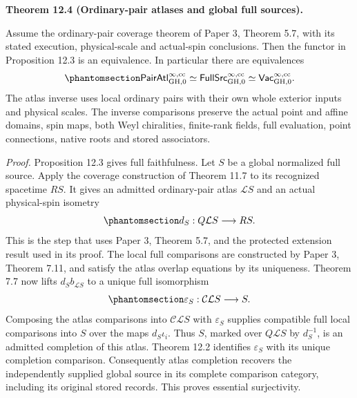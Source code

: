 \documentclass[
  english,
  11pt,
  reqno]{amsart}
\makeatletter
\newcommand{\pandocstatementheading}[1]{%
  \par\addpenalty{\@beginparpenalty}%
  \addvspace{.5\baselineskip plus .2\baselineskip minus .2\baselineskip}%
  {\normalfont\bfseries #1\par}%
  \nobreak\@afterindenttrue\@afterheading
}
\makeatother
\begin{document}
\pandocstatementheading{\protect{}\label{thm:ordinary-atlas-full-source-equivalence}Theorem 12.4 (Ordinary-pair atlases and global full sources).}

Assume the ordinary-pair coverage theorem of Paper 3, Theorem 5.7, with
its stated execution, physical-scale and actual-spin conclusions. Then
the functor in Proposition 12.3 is an equivalence. In particular there
are equivalences
\begin{equation}\protect\phantomsection\label{eq:ordinary-atlas-global-correspondence}{
\mathsf{PairAtl}^{\infty,\mathrm{cc}}_{\mathrm{GH},0}
\simeq
\mathsf{FullSrc}^{\infty,\mathrm{cc}}_{\mathrm{GH},0}
\simeq
\mathsf{Vac}^{\infty,\mathrm{cc}}_{\mathrm{GH},0}.
}\end{equation} The atlas inverse uses local ordinary pairs with their
own whole exterior inputs and physical scales. The inverse comparisons
preserve the actual point and affine domains, spin maps, both Weyl
chiralities, finite-rank fields, full evaluation, point connections,
native roots and stored associators.

\emph{Proof.} Proposition 12.3 gives full faithfulness. Let \(S\) be a
global normalized full source. Apply the coverage construction of
Theorem 11.7 to its recognized spacetime \(RS\). It gives an admitted
ordinary-pair atlas \(\mathcal L S\) and an actual physical-spin
isometry
\begin{equation}\protect\phantomsection\label{eq:ordinary-atlas-inverse-geometry}{
d_S:Q\mathcal L S\longrightarrow RS.
}\end{equation} This is the step that uses Paper 3, Theorem 5.7, and the
protected extension result used in its proof. The local full comparisons
are constructed by Paper 3, Theorem 7.11, and satisfy the atlas overlap
equations by its uniqueness. Theorem 7.7 now lifts
\(d_S b_{\mathcal L S}\) to a unique full isomorphism
\begin{equation}\protect\phantomsection\label{eq:ordinary-atlas-inverse-counit}{
\varepsilon_S:\mathcal C\mathcal L S\longrightarrow S.
}\end{equation} Composing the atlas comparisons into
\(\mathcal C\mathcal L S\) with \(\varepsilon_S\) supplies compatible
full local comparisons into \(S\) over the maps \(d_S\iota_i\). Thus
\(S\), marked over \(Q\mathcal L S\) by \(d_S^{-1}\), is an admitted
completion of this atlas. Theorem 12.2 identifies \(\varepsilon_S\) with
its unique completion comparison. Consequently atlas completion recovers
the independently supplied global source in its complete comparison
category, including its original stored records. This proves essential
surjectivity.
\end{document}
